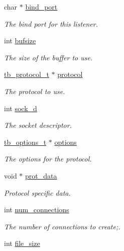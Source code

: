 \begin{DoxyCompactItemize}
char $\ast$ \hyperlink{structtb__listener__t_a5c96fa09c995ca60f7b334c1842eb991}{bind\-\_\-port}
\begin{DoxyCompactList}\small\item\em The bind port for this listener. \end{DoxyCompactList}\item 
int \hyperlink{structtb__listener__t_a199ab88d4ca8eab30e1cb7d35edacca5}{bufsize}
\begin{DoxyCompactList}\small\item\em The size of the buffer to use. \end{DoxyCompactList}\item 
\hyperlink{structtb__protocol__t}{tb\-\_\-protocol\-\_\-t} $\ast$ \hyperlink{structtb__listener__t_a0b0f6789be37cb22fa42abe30a271591}{protocol}
\begin{DoxyCompactList}\small\item\em The protocol to use. \end{DoxyCompactList}\item 
int \hyperlink{structtb__listener__t_a94d540b145f21be2f9b28a2c225ccf30}{sock\-\_\-d}
\begin{DoxyCompactList}\small\item\em The socket descriptor. \end{DoxyCompactList}\item 
\hyperlink{structtb__options__t}{tb\-\_\-options\-\_\-t} $\ast$ \hyperlink{structtb__listener__t_abe6a138a14cade5eb871eeb66ee2b638}{options}
\begin{DoxyCompactList}\small\item\em The options for the protocol. \end{DoxyCompactList}\item 
void $\ast$ \hyperlink{structtb__listener__t_ab79822e20d19ce95bdf8a3f95bd616d5}{prot\-\_\-data}
\begin{DoxyCompactList}\small\item\em Protocol specific data. \end{DoxyCompactList}\item 
int \hyperlink{structtb__listener__t_acbf48788378975ac1fb514027e3dc1ab}{num\-\_\-connections}
\begin{DoxyCompactList}\small\item\em The number of connections to create;. \end{DoxyCompactList}\item 
int \hyperlink{structtb__listener__t_a8bc95708c758a6400d8692f2d0fcbaeb}{file\-\_\-size}

\end{DoxyCompactItemize}
